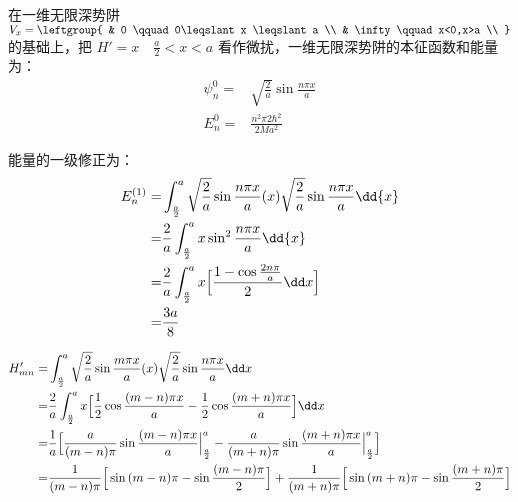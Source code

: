 \subsection{ }
在一维无限深势阱 $V_{x} = \leftgroup{
    & 0 \qquad 0\leqslant x \leqslant a \\
    & \infty \qquad x<0,x>a \\
}$ 的基础上，把 $H' = x \quad \frac{a}{2} < x < a $ 看作微扰，一维无限深势阱的本征函数和能量为：\\
\begin{equation}
\begin{aligned}
\psi^{0}_{n}=& \sqrt{\frac{2}{a}} \sin{\frac{n\pi x}{a}}\\
E^{0}_{n}=& \frac{n^{2}\pi{2}\hbar^{2}}{2Ma^2}
\end{aligned}
\end{equation}

能量的一级修正为：\\
\begin{equation}
\begin{aligned}
E^{(1)}_{n}=&\int^{a}_{\frac{a}{2}} \sqrt{\frac{2}{a}} \sin{\frac{n\pi x}{a}}(x)\sqrt{\frac{2}{a}} \sin{\frac{n\pi x}{a}} \dd{x} \\
=& \frac{2}{a} \int^{a}_{\frac{a}{2}} x\sin^{2}{\frac{n\pi x}{a}} \dd{x} \\
=& \frac{2}{a}\int^{a}_{\frac{a}{2}} x\Bigl[\frac{1-\cos{\frac{2n \pi}{a}}}{2}\dd x\Bigr] \\
=& \frac{3a}{8}
\end{aligned}
\end{equation}

\begin{equation}
\begin{aligned}
H'_{mn} =& \int^{a}_{\frac{a}{2}} \sqrt{\frac{2}{a}} \sin{\frac{m \pi x}{a}} (x) \sqrt{\frac{2}{a} }\sin{\frac{n \pi x}{a}} \dd x \\
=& \frac{2}{a} \int^{a}_{\frac{a}{2}} x\Bigl[\frac{1}{2} \cos{\frac{(m-n)\pi x}{a}} - \frac{1}{2} \cos{\frac{(m+n) \pi x}{a}}\Bigr] \dd x \\
=& \frac{1}{a} \Bigl[\frac{a}{(m-n)\pi} \sin{\frac{(m-n)\pi x}{a}}\Big|^{a}_{\frac{a}{2}} - \frac{a}{(m+n)\pi} \sin{\frac{(m+n)\pi x}{a}}\Big|^{a}_{\frac{a}{2}}\Bigr] \\
=& \frac{1}{(m-n)\pi} \Big[\sin{(m-n)\pi} - \sin{\frac{(m-n)\pi}{2}}\Big]+\frac{1}{(m+n)\pi} \Big[\sin{(m+n)\pi} -\sin{\frac{(m+n)\pi}{2}} \Big]
\end{aligned}
\end{equation}

